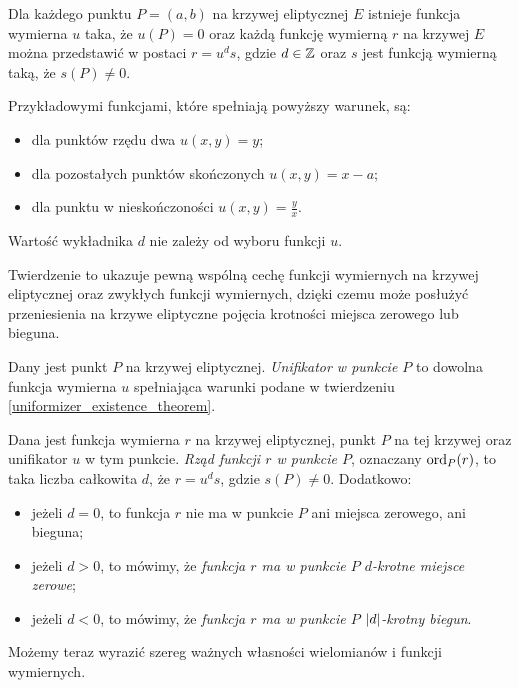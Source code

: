 \begin{theorem}\label{uniformizer_existence_theorem}
Dla każdego punktu $P = (a, b)$ na krzywej eliptycznej $E$
istnieje funkcja wymierna $u$ taka, że $u(P) = 0$
oraz każdą funkcję wymierną $r$ na krzywej $E$
można przedstawić w postaci $r = u^ds$,
gdzie $d \in \mathbb{Z}$ oraz $s$ jest funkcją wymierną taką, że $s(P) \neq 0$.

Przykładowymi funkcjami, które spełniają powyższy warunek, są:
\begin{itemize}
\item dla punktów rzędu dwa $u(x, y) = y$;
\item dla pozostałych punktów skończonych $u(x, y) = x - a$;
\item dla punktu w nieskończoności $u(x, y) = \frac{y}{x}$.
\end{itemize}

Wartość wykładnika $d$ nie zależy od wyboru funkcji $u$.
\end{theorem}

Twierdzenie to ukazuje pewną wspólną cechę
funkcji wymiernych na krzywej eliptycznej
oraz zwykłych funkcji wymiernych,
dzięki czemu może posłużyć przeniesienia na krzywe eliptyczne
pojęcia krotności miejsca zerowego lub bieguna.

\begin{definition}
Dany jest punkt $P$ na krzywej eliptycznej.
\emph{Unifikator w punkcie $P$}
to dowolna funkcja wymierna $u$
spełniająca warunki podane w twierdzeniu \ref{uniformizer_existence_theorem}.
\end{definition}

\begin{definition}
Dana jest funkcja wymierna $r$ na krzywej eliptycznej,
punkt $P$ na tej krzywej oraz unifikator $u$ w tym punkcie.
\emph{Rząd funkcji $r$ w punkcie $P$},
oznaczany $\operatorname{ord}_P(r)$,
to taka liczba całkowita $d$,
że $r = u^ds$, gdzie $s(P) \neq 0$.
Dodatkowo:
\begin{itemize}
\item jeżeli $d = 0$,
to funkcja $r$ nie ma w punkcie $P$ ani miejsca zerowego, ani bieguna;
\item jeżeli $d > 0$, to mówimy,
że \emph{funkcja $r$ ma w punkcie $P$ $d$-krotne miejsce zerowe};
\item jeżeli $d < 0$, to mówimy,
że \emph{funkcja $r$ ma w punkcie $P$ $\lvert d\rvert$-krotny biegun}.
\end{itemize}
\end{definition}

Możemy teraz wyrazić szereg ważnych własności
wielomianów i funkcji wymiernych.

